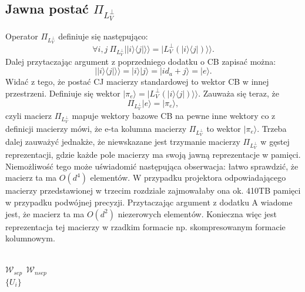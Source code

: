 \documentclass[10pt]{article} %
\newcommand{\Ket}[1]{|#1\rangle}
\newcommand{\Bra}[1]{\langle#1|}
\newcommand{\KKet}[1]{|#1\rangle\rangle}
\newcommand{\LPV}{{L^\perp_V}}
\begin{document}
\begin{appendices}
\section{Jawna postać $\Pi_\LPV$}
Operator $\Pi_\LPV$ definiuje się następująco:
\begin{equation}
\forall i,j~\Pi_\LPV \KKet{\Ket{i}\Bra{j}} = \KKet{\LPV(\Ket{i}\Bra{j})}.
\end{equation}
Dalej przytaczając argument z poprzedniego dodatku o CB zapisać można:
\begin{equation}
\KKet{\Ket{i}\Bra{j}} = \Ket{i}\Ket{j} = \Ket{i d_a + j} = \Ket{e}.
\end{equation} Widać z tego, że postać CJ macierzy standardowej to wektor CB w innej przestrzeni.
Definiuje się wektor $\Ket{\pi_{e}} = \KKet{\LPV(\Ket{i}\Bra{j})}$. Zauważa się teraz, że 
\begin{equation}
\Pi_\LPV \Ket{e} = \Ket{\pi_{e}},
\end{equation} czyli macierz $\Pi_\LPV$ mapuje wektory bazowe CB na pewne inne wektory co z definicji macierzy mówi, że e-ta kolumna macierzy $\Pi_\LPV$ to wektor $\Ket{\pi_{e}}$.
Trzeba dalej zauważyć jednakże, że niewskazane jest trzymanie macierzy $\Pi_\LPV$ w gęstej reprezentacji, gdzie każde pole macierzy ma swoją jawną reprezentacje w pamięci.
Niemożliwość tego może uświadomić następująca obserwacja: łatwo sprawdzić, że macierz ta ma $O(d^4)$ elementów. W przypadku projektora odpowiadającego macierzy przedstawionej w trzecim rozdziale zajmowałaby ona ok. 410TB pamięci w przypadku podwójnej precyzji.
Przytaczając argument z dodatku A wiadome jest, że macierz ta ma $O(d^2)$ niezerowych elementów. Konieczna więc jest reprezentacja tej macierzy w rzadkim formacie np. skompresowanym formacie kolumnowym.
\end{appendices}
\\
$\mathcal{W}_{sep}~~\mathcal{W}_{nsep}$\\
$\{ U_i\}$
\end{document}
